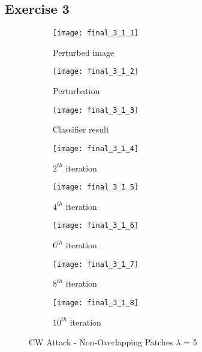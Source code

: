\documentclass[11pt]{article}
\begin{document}


\subsection*{Exercise 3}

\begin{figure}[H]
\begin{subfigure}{.22\textwidth}
  \centering
  \texttt{[image: final\_3\_1\_1]}
  \caption{Perturbed image}
  \label{fig:}
\end{subfigure}
\begin{subfigure}{.22\textwidth}
  \centering
  \texttt{[image: final\_3\_1\_2]}
  \caption{Perturbation}
  \label{fig:}
\end{subfigure}
\begin{subfigure}{.22\textwidth}
  \centering
  \texttt{[image: final\_3\_1\_3]}
  \caption{Classifier result}
  \label{fig:}
\end{subfigure}
\begin{subfigure}{.22\textwidth}
  \centering
  \texttt{[image: final\_3\_1\_4]}
  \caption{$2^{th}$ iteration}
  \label{fig:}
\end{subfigure}

\begin{subfigure}{.22\textwidth}
  \centering
  \texttt{[image: final\_3\_1\_5]}
  \caption{$4^{th}$ iteration}
  \label{fig:}
\end{subfigure}
\begin{subfigure}{.22\textwidth}
  \centering
  \texttt{[image: final\_3\_1\_6]}
  \caption{$6^{th}$ iteration}
  \label{fig:}
\end{subfigure}
\begin{subfigure}{.22\textwidth}
  \centering
  \texttt{[image: final\_3\_1\_7]}
  \caption{$8^{th}$ iteration}
  \label{fig:}
\end{subfigure}
\begin{subfigure}{.22\textwidth}
  \centering
  \texttt{[image: final\_3\_1\_8]}
  \caption{$10^{th}$ iteration}
  \label{fig:}
\end{subfigure}

\caption{CW Attack - Non-Overlapping Patches $\lambda$ = 5}
\label{fig:}
\end{figure}
\end{document}
